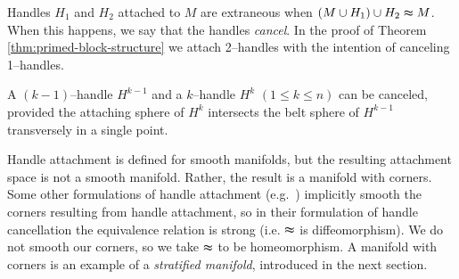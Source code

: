 Handles $H_1$ and $H_2$ attached to $M$ are extraneous when $(M\cup H_1)\cup H_2\thickapprox M$.
When this happens, we say that the handles \emph{cancel}.
In the proof of Theorem \ref{thm:primed-block-structure} we attach 2--handles with the intention of canceling 1--handles.


\begin{prop}
	A $(k-1)$--handle $H^{k-1}$ and a $k$--handle $H^k$ $(1\leq k\leq n)$ can be canceled, provided the attaching sphere of $H^k$ intersects the belt sphere of $H^{k-1}$ transversely in a single point.
\end{prop}

Handle attachment is defined for smooth manifolds, but the resulting attachment space is not a smooth manifold.
Rather, the result is a manifold with corners.
Some other formulations of handle attachment (e.g.\ \cite{GompStip}) implicitly smooth the corners resulting from handle attachment, so in their formulation of handle cancellation the equivalence relation is strong (i.e. $\thickapprox$ is diffeomorphism).
We do not smooth our corners, so we take $\thickapprox$ to be homeomorphism.
A manifold with corners is an example of a \emph{stratified manifold}, introduced in the next section.




